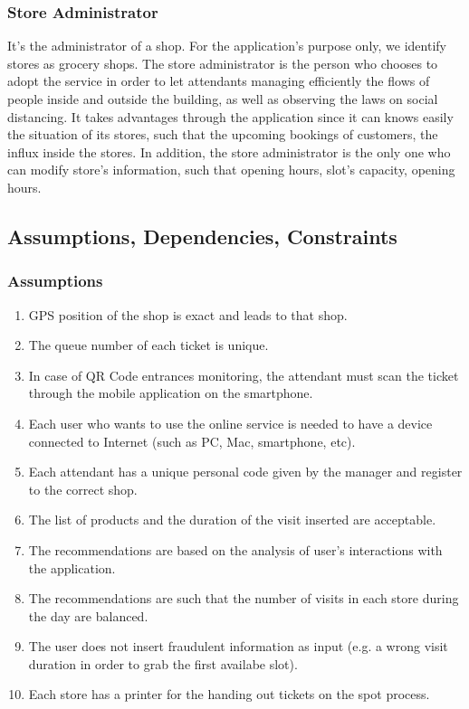 \documentclass[table, 12pt]{article}
\begin{document}
\subsubsection{Store Administrator}
It's the administrator of a shop. For the application's purpose only, we identify stores as grocery shops. The store administrator is the person who chooses to adopt the service in order to let attendants managing efficiently the flows of people inside and outside the building, as well as observing the laws on social distancing. It takes advantages through the application since it can knows easily the situation of its stores, such that the upcoming bookings of customers, the influx inside the stores. In addition, the store administrator is the only one who can modify store's information, such that opening hours, slot's capacity, opening hours.

\subsection{Assumptions, Dependencies, Constraints}
\subsubsection{Assumptions}
\begin{enumerate}[label=\textbf{D\arabic*}:]
    \item GPS position of the shop is exact and leads to that shop.
    \item The queue number of each ticket is unique.
    \item In case of QR Code entrances monitoring, the attendant must scan the ticket through the mobile application on the smartphone.
    \item Each user who wants to use the online service is needed to have a device connected to Internet (such as PC, Mac, smartphone, etc).
    \item Each attendant has a unique personal code given by the manager and register to the correct shop.
    \item The list of products and the duration of the visit inserted are acceptable.
    \item The recommendations are based on the analysis of user's interactions with the application.
    \item The recommendations are such that the number of visits in each store during the day are balanced.
    \item The user does not insert fraudulent information as input (e.g. a wrong visit duration in order to grab the first availabe slot).
    \item Each store has a printer for the handing out tickets on the spot process.
\end{enumerate}
\end{document}
